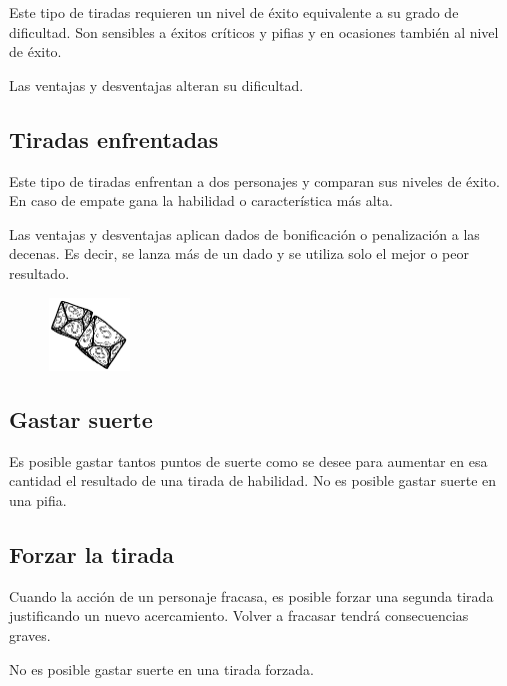 Este tipo de tiradas requieren un nivel de éxito equivalente a su grado de dificultad. Son sensibles a éxitos críticos y pifias y en ocasiones también al nivel de éxito.

Las ventajas y desventajas alteran su dificultad.

\subsection{Tiradas enfrentadas}

Este tipo de tiradas enfrentan a dos personajes y comparan sus niveles de éxito. En caso de empate gana la habilidad o característica más alta. 

Las ventajas y desventajas aplican dados de bonificación o penalización a las decenas. Es decir, se lanza más de un dado y se utiliza solo el mejor o peor resultado.

\vspace{-1.5\parskip}

\begin{figure}[h]
    \centering
    \includegraphics[width=0.19\textwidth]{images/2d10.png}
\end{figure}

\vspace{-2\parskip}

\subsection{Gastar suerte}

Es posible gastar tantos puntos de suerte como se desee para aumentar en esa cantidad el resultado de una tirada de habilidad. No es posible gastar suerte en una pifia.

\subsection{Forzar la tirada}

Cuando la acción de un personaje fracasa, es posible forzar una segunda tirada justificando un nuevo acercamiento. Volver a fracasar tendrá consecuencias graves.

No es posible gastar suerte en una tirada forzada.